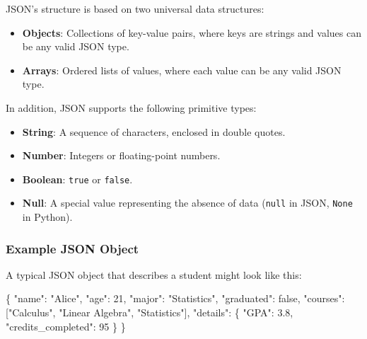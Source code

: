 \documentclass[
  letterpaper,
  DIV=11,
  numbers=noendperiod]{scrreprt}
\newenvironment{Shaded}{\begin{snugshade}}{\end{snugshade}}
\newcommand{\DataTypeTok}[1]{\textcolor[rgb]{0.68,0.00,0.00}{#1}}
\newcommand{\DecValTok}[1]{\textcolor[rgb]{0.68,0.00,0.00}{#1}}
\newcommand{\FloatTok}[1]{\textcolor[rgb]{0.68,0.00,0.00}{#1}}
\newcommand{\FunctionTok}[1]{\textcolor[rgb]{0.28,0.35,0.67}{#1}}
\newcommand{\KeywordTok}[1]{\textcolor[rgb]{0.00,0.23,0.31}{#1}}
\newcommand{\OtherTok}[1]{\textcolor[rgb]{0.00,0.23,0.31}{#1}}
\newcommand{\StringTok}[1]{\textcolor[rgb]{0.13,0.47,0.30}{#1}}
\providecommand{\tightlist}{%
  \setlength{\itemsep}{0pt}\setlength{\parskip}{0pt}}\usepackage{longtable,booktabs,array}
\begin{document}
JSON's structure is based on two universal data structures:

\begin{itemize}
\tightlist
\item
  \textbf{Objects}: Collections of key-value pairs, where keys are
  strings and values can be any valid JSON type.
\item
  \textbf{Arrays}: Ordered lists of values, where each value can be any
  valid JSON type.
\end{itemize}

In addition, JSON supports the following primitive types:

\begin{itemize}
\tightlist
\item
  \textbf{String}: A sequence of characters, enclosed in double quotes.
\item
  \textbf{Number}: Integers or floating-point numbers.
\item
  \textbf{Boolean}: \texttt{true} or \texttt{false}.
\item
  \textbf{Null}: A special value representing the absence of data
  (\texttt{null} in JSON, \texttt{None} in Python).
\end{itemize}

\hypertarget{example-json-object}{%
\subsubsection{Example JSON Object}\label{example-json-object}}

A typical JSON object that describes a student might look like this:

\begin{Shaded}
\begin{Highlighting}[]
\FunctionTok{\{}
    \DataTypeTok{"name"}\FunctionTok{:} \StringTok{"Alice"}\FunctionTok{,}
    \DataTypeTok{"age"}\FunctionTok{:} \DecValTok{21}\FunctionTok{,}
    \DataTypeTok{"major"}\FunctionTok{:} \StringTok{"Statistics"}\FunctionTok{,}
    \DataTypeTok{"graduated"}\FunctionTok{:} \KeywordTok{false}\FunctionTok{,}
    \DataTypeTok{"courses"}\FunctionTok{:} \OtherTok{[}\StringTok{"Calculus"}\OtherTok{,} \StringTok{"Linear Algebra"}\OtherTok{,} \StringTok{"Statistics"}\OtherTok{]}\FunctionTok{,}
    \DataTypeTok{"details"}\FunctionTok{:} \FunctionTok{\{}
        \DataTypeTok{"GPA"}\FunctionTok{:} \FloatTok{3.8}\FunctionTok{,}
        \DataTypeTok{"credits\_completed"}\FunctionTok{:} \DecValTok{95}
    \FunctionTok{\}}
\FunctionTok{\}}
\end{Highlighting}
\end{Shaded}
\end{document}
